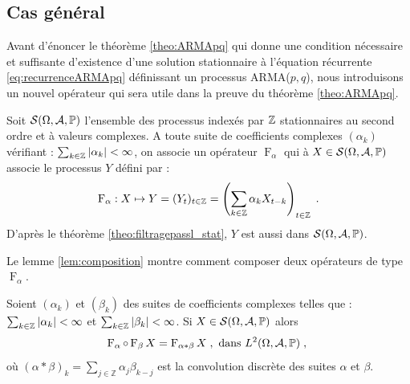 \subsection{Cas g\'en\'eral}\label{sec:cas_general}
Avant d'\'enoncer le th\'eor\`eme \ref{theo:ARMApq} qui donne
une condition n\'ecessaire et suffisante d'existence d'une solution stationnaire
\`a l'\'equation r\'ecurrente \eqref{eq:recurrenceARMApq}
d\'efinissant un processus ARMA($p,q$), nous introduisons un nouvel op\'erateur
qui sera utile dans la preuve du th\'eor\`eme \ref{theo:ARMApq}.

Soit $\mathcal{S}(\Omega,\mathcal{A},\mathbb{P})$ l'ensemble des processus index\'es par $\mathbb{Z}$
stationnaires au second ordre et \`a valeurs complexes. A toute suite de
coefficients complexes $(\alpha_k)$ v\'erifiant :
$\sum_{k\in\mathbb{Z}}|\alpha_k|<\infty$, on associe un op\'erateur
$\operatorname{F}_\alpha$ qui \`a $X\in\mathcal{S}(\Omega,\mathcal{A},\mathbb{P})$ associe le processus $Y$
d\'efini par :
$$
\operatorname{F}_\alpha:X\mapsto Y=(Y_t)_{t\in\mathbb{Z}}=\left(\sum_{k\in\mathbb{Z}}\alpha_k X_{t-k}\right)_{t\in\mathbb{Z}}\; .
$$
D'apr\`es le th\'eor\`eme \ref{theo:filtragepassl_stat}, $Y$ est aussi dans $\mathcal{S}(\Omega,\mathcal{A},\mathbb{P})$.

Le lemme \ref{lem:composition} montre comment composer deux op\'erateurs
de type $\operatorname{F}_\alpha$.

\begin{lemma}\label{lem:composition}
  Soient $(\alpha_k)$ et $(\beta_k)$ des suites de coefficients complexes
  telles que : $\sum_{k\in\mathbb{Z}}|\alpha_k|<\infty$ et
  $\sum_{k\in\mathbb{Z}}|\beta_k|<\infty$.  Si $X\in\mathcal{S}(\Omega,\mathcal{A},\mathbb{P})$ alors
$$
\operatorname{F}_{\alpha} \circ \operatorname{F}_{\beta}X = \operatorname{F}_{\alpha * \beta} X\;, \textrm{
  dans } L^2(\Omega,\mathcal{A},\mathbb{P})\;,\;
$$
o\`u $(\alpha*\beta)_k=\sum_{j\in\mathbb{Z}}\alpha_j\beta_{k-j}$ est la convolution discrète des suites $\alpha$ et $\beta$.
\end{lemma}

